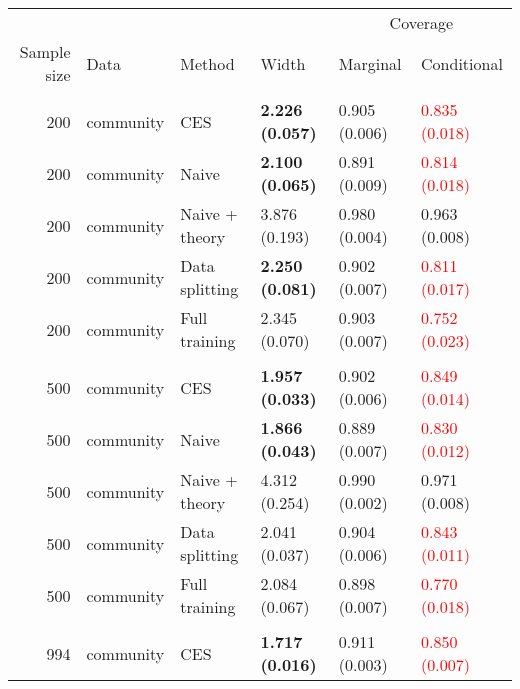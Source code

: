 
\begin{tabular}[t]{rlllll}
\toprule
\multicolumn{4}{c}{ } & \multicolumn{2}{c}{Coverage} \\
\cmidrule(l{3pt}r{3pt}){5-6}
Sample size & Data & Method & Width & Marginal & Conditional\\
\midrule
\addlinespace[0.3em]
\multicolumn{6}{l}{\textbf{200}}\\
\hspace{1em}200 & community & CES & \textbf{2.226 (0.057)} & 0.905 (0.006) & \textcolor{red}{0.835 (0.018)}\\
\hspace{1em}200 & community & Naive & \textbf{2.100 (0.065)} & 0.891 (0.009) & \textcolor{red}{0.814 (0.018)}\\
\hspace{1em}200 & community & Naive + theory & 3.876 (0.193) & 0.980 (0.004) & 0.963 (0.008)\\
\hspace{1em}200 & community & Data splitting & \textbf{2.250 (0.081)} & 0.902 (0.007) & \textcolor{red}{0.811 (0.017)}\\
\hspace{1em}200 & community & Full training & 2.345 (0.070) & 0.903 (0.007) & \textcolor{red}{0.752 (0.023)}\\
\addlinespace[0.3em]
\multicolumn{6}{l}{\textbf{500}}\\
\hspace{1em}500 & community & CES & \textbf{1.957 (0.033)} & 0.902 (0.006) & \textcolor{red}{0.849 (0.014)}\\
\hspace{1em}500 & community & Naive & \textbf{1.866 (0.043)} & 0.889 (0.007) & \textcolor{red}{0.830 (0.012)}\\
\hspace{1em}500 & community & Naive + theory & 4.312 (0.254) & 0.990 (0.002) & 0.971 (0.008)\\
\hspace{1em}500 & community & Data splitting & 2.041 (0.037) & 0.904 (0.006) & \textcolor{red}{0.843 (0.011)}\\
\hspace{1em}500 & community & Full training & 2.084 (0.067) & 0.898 (0.007) & \textcolor{red}{0.770 (0.018)}\\
\addlinespace[0.3em]
\multicolumn{6}{l}{\textbf{994}}\\
\hspace{1em}994 & community & CES & \textbf{1.717 (0.016)} & 0.911 (0.003) & \textcolor{red}{0.850 (0.007)}\\

\end{tabular}

